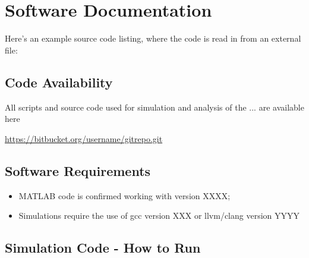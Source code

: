 \chapter{Software Documentation}




Here's an example source code listing, where the code is read in from an external file:



\section{Code Availability}
All scripts and source code used for simulation and analysis of the ... are available here
 
\url{https://bitbucket.org/username/gitrepo.git}

\section{Software Requirements}
\begin{itemize}
\item MATLAB code is confirmed working with version XXXX;
\item Simulations require the use of gcc version XXX or llvm/clang version YYYY
\end{itemize}

\section{Simulation Code - How to Run}

